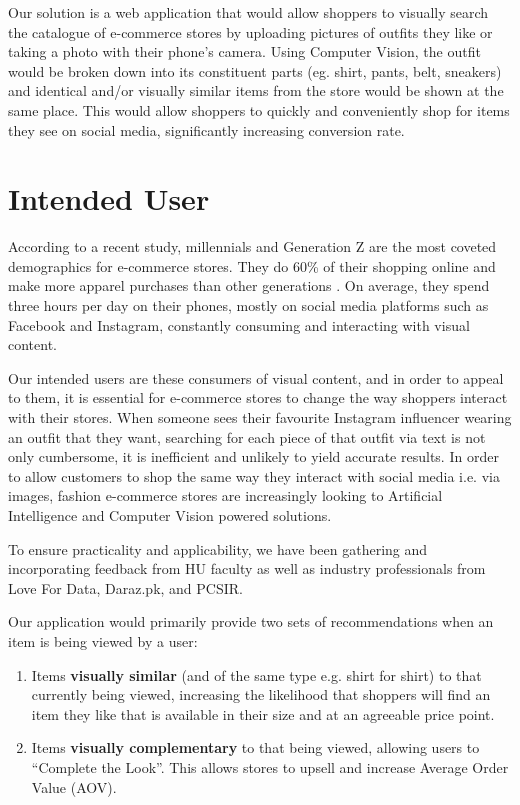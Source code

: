 Our solution is a web application that would allow shoppers to visually search the catalogue of e-commerce stores by uploading pictures of outfits they like or taking a photo with their phone’s camera. Using Computer Vision, the outfit would be broken down into its constituent parts (eg. shirt, pants, belt, sneakers) and identical and/or visually similar items from the store would be shown at the same place. This would allow shoppers to quickly and conveniently shop for items they see on social media, significantly increasing conversion rate.

\section{Intended User}

According to a recent study, millennials and Generation Z are the most coveted demographics for e-commerce stores. They do 60\% of their shopping online \cite{commerce360} and make more apparel purchases than other generations \cite{emarketer}. On average, they spend three hours per day on their phones, mostly on social media platforms such as Facebook and Instagram, constantly consuming and interacting with visual content.

Our intended users are these consumers of visual content, and in order to appeal to them, it is essential for e-commerce stores to change the way shoppers interact with their stores. When someone sees their favourite Instagram influencer wearing an outfit that they want, searching for each piece of that outfit via text is not only cumbersome, it is inefficient and unlikely to yield accurate results. In order to allow customers to shop the same way they interact with social media i.e. via images, fashion e-commerce stores are increasingly looking to Artificial Intelligence and Computer Vision powered solutions.

To ensure practicality and applicability, we have been gathering and incorporating feedback from HU faculty as well as industry professionals from Love For Data, Daraz.pk, and PCSIR.

Our application would primarily provide two sets of recommendations when an item is being viewed by a user:
\begin{enumerate}
	\item Items \textbf{visually similar} (and of the same type e.g. shirt for shirt) to that currently being viewed, increasing the likelihood that shoppers will find an item they like that is available in their size and at an agreeable price point.
	\item Items \textbf{visually complementary} to that being viewed, allowing users to “Complete the Look”. This allows stores to upsell and increase Average Order Value (AOV).
\end{enumerate}

